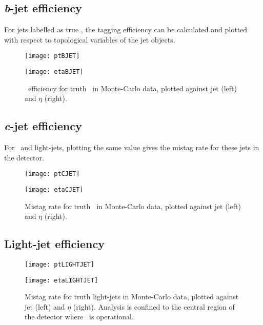 	\newpage
	\subsection{\textit{b}-jet efficiency}

	For jets labelled as true \bjets, the tagging efficiency can be calculated and plotted with respect to topological variables of the jet objects.

		\begin{figure}[h]
			\centering
			\begin{minipage}[h]{0.48\linewidth}
				\texttt{[image: ptBJET]}

			\end{minipage}
			\quad
			\begin{minipage}[h]{0.48\linewidth}
				\texttt{[image: etaBJET]}
			\end{minipage}
			\caption{\btag\, efficiency for truth \bjets\, in Monte-Carlo data, plotted against jet \pt (left) and $\eta$ (right).}
			\label{fig:MC:bjetefficiency}
		\end{figure}

	\subsection{\textit{c}-jet efficiency}
	For \cjets\, and light-jets, plotting the same value gives the mistag rate for these jets in the detector.

		\begin{figure}[h]
			\centering
			\begin{minipage}[h]{0.48\linewidth}
				\texttt{[image: ptCJET]}

			\end{minipage}
			\quad
			\begin{minipage}[h]{0.48\linewidth}
				\texttt{[image: etaCJET]}
			\end{minipage}
			\caption{Mistag rate for truth \bjets\, in Monte-Carlo data, plotted against jet \pt (left) and $\eta$ (right).}
			\label{fig:MC:cjetefficiency}
		\end{figure}

\newpage
	\subsection{Light-jet efficiency}

		\begin{figure}[h]
			\centering
			\begin{minipage}[h]{0.48\linewidth}
				\texttt{[image: ptLIGHTJET]}

			\end{minipage}
			\quad
			\begin{minipage}[h]{0.48\linewidth}
				\texttt{[image: etaLIGHTJET]}
			\end{minipage}
			\caption{Mistag rate for truth light-jets in Monte-Carlo data, plotted against jet \pt (left) and $\eta$ (right). Analysis is confined to the central region of the detector where \btag\, is operational.}
			\label{fig:MC:lightjetefficiency}
		\end{figure}


